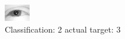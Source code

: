 \begin{figure}[h!]
\begin{center}
\includegraphics[width=0.60\columnwidth]{figures/ID2380_class_2_target_3.png}
\end{center}
\caption{ Classification: 2 actual target: 3}
\label{fig:ID2380_class_2_target_3}
\end{figure}
